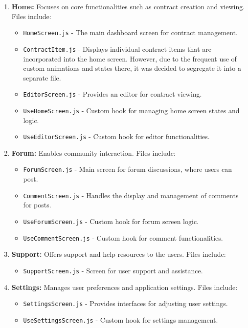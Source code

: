 \begin{enumerate}
    \item \textbf{Home:} Focuses on core functionalities such as contract creation and viewing. Files include:
    \begin{itemize}
        \item \texttt{HomeScreen.js} - The main dashboard screen for contract management.
        \item \texttt{ContractItem.js} - Displays individual contract items that are incorporated into the home screen. However, due to the frequent use of custom animations and states there, it was decided to segregate it into a separate file.
        \item \texttt{EditorScreen.js} - Provides an editor for contract viewing.
        \item \texttt{UseHomeScreen.js} - Custom hook for managing home screen states and logic.
        \item \texttt{UseEditorScreen.js} - Custom hook for editor functionalities.
    \end{itemize}
    \item \textbf{Forum:} Enables community interaction. Files include:
    \begin{itemize}
        \item \texttt{ForumScreen.js} - Main screen for forum discussions, where users can post.
        \item \texttt{CommentScreen.js} - Handles the display and management of comments for posts.
        \item \texttt{UseForumScreen.js} - Custom hook for forum screen logic.
        \item \texttt{UseCommentScreen.js} - Custom hook for comment functionalities.
    \end{itemize}
    \item \textbf{Support:} Offers support and help resources to the users. Files include:
    \begin{itemize}
        \item \texttt{SupportScreen.js} - Screen for user support and assistance.
    \end{itemize}
    \item \textbf{Settings:} Manages user preferences and application settings. Files include:
    \begin{itemize}
        \item \texttt{SettingsScreen.js} - Provides interfaces for adjusting user settings.
        \item \texttt{UseSettingsScreen.js} - Custom hook for settings management.
    \end{itemize}
\end{enumerate}

